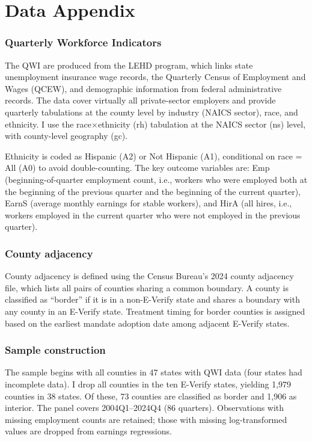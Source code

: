 \documentclass[12pt]{article}
\begin{document}
\section{Data Appendix}

\subsubsection*{Quarterly Workforce Indicators} The QWI are produced from the LEHD program, which links state unemployment insurance wage records, the Quarterly Census of Employment and Wages (QCEW), and demographic information from federal administrative records. The data cover virtually all private-sector employers and provide quarterly tabulations at the county level by industry (NAICS sector), race, and ethnicity. I use the race$\times$ethnicity (rh) tabulation at the NAICS sector (ns) level, with county-level geography (gc).

Ethnicity is coded as Hispanic (A2) or Not Hispanic (A1), conditional on race = All (A0) to avoid double-counting. The key outcome variables are: Emp (beginning-of-quarter employment count, i.e., workers who were employed both at the beginning of the previous quarter and the beginning of the current quarter), EarnS (average monthly earnings for stable workers), and HirA (all hires, i.e., workers employed in the current quarter who were not employed in the previous quarter).

\subsubsection*{County adjacency} County adjacency is defined using the Census Bureau's 2024 county adjacency file, which lists all pairs of counties sharing a common boundary. A county is classified as ``border'' if it is in a non-E-Verify state and shares a boundary with any county in an E-Verify state. Treatment timing for border counties is assigned based on the earliest mandate adoption date among adjacent E-Verify states.

\subsubsection*{Sample construction} The sample begins with all counties in 47 states with QWI data (four states had incomplete data). I drop all counties in the ten E-Verify states, yielding 1,979 counties in 38 states. Of these, 73 counties are classified as border and 1,906 as interior. The panel covers 2004Q1--2024Q4 (86 quarters). Observations with missing employment counts are retained; those with missing log-transformed values are dropped from earnings regressions.
\end{document}
